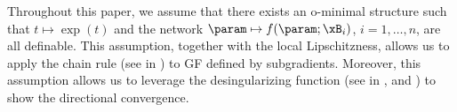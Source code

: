 Throughout this paper, we assume that 
there exists an o-minimal structure such that $t\mapsto\exp(t)$ and the network $\param\mapsto f(\param; \xB_i)$, $i=1,\dots,n$, are all definable. 
This assumption, together with the local Lipschitzness, allows us to apply the chain rule (see  in ) to GF defined by subgradients. 
Moreover, this assumption allows us to leverage the desingularizing function (see  in , and \citet{ji2020directional}) to show the directional convergence. 






